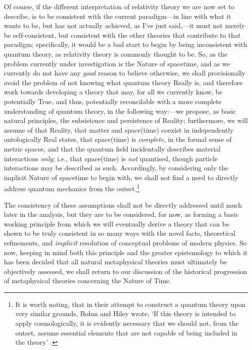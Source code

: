 Of course, if the different interpretation of relativity theory we are now set to describe, is to be consistent with the current paradigm---in line with what it wants to be, but has not actually achieved, as I've just said,---it must not merely be self-consistent, but consistent with the other theories that contribute to that paradigm; specifically, it would be a bad start to begin by being inconsistent with quantum theory, as relativity theory is commonly thought to be. So, as the problem currently under investigation is the Nature of spacetime, and as we currently do not have any \textit{good} reason to believe otherwise, we shall provisionally avoid the problem of not knowing what quantum theory Really is, and therefore work towards developing a theory that may, for all we currently know, be potentially True, and thus, potentially reconcilable with a more complete understanding of quantum theory, in the following way:---we propose, as basic natural principles, the subsistence and persistence of Reality; furthermore, we will assume of that Reality, that matter and space(time) coexist in independently ontologically Real states, that space(time) is \textit{complete}, in the formal sense of metric spaces, and that the quantum field incidentally describes material interactions \textit{only}; i.e., that space(time) is \textit{not} quantised, though particle interactions may be described as such. Accordingly, by considering only the implicit Nature of spacetime to begin with, we shall not find a need to directly address quantum mechanics from the outset.\footnote{It is worth noting, that in their attempt to construct a quantum theory upon very similar grounds, Bohm and Hiley wrote, `If this theory is intended to apply cosmologically, it is evidently necessary that we should not, from the outset, assume essential elements that are not capable of being included in the theory' \cite{Bohm1993}.} 

The consistency of these assumptions shall not be directly addressed until much later in the analysis, but they are to be considered, for now, as forming a basic working principle from which we will eventually derive a theory that can be shown to be truly consistent in so many ways with the novel facts, theoretical refinements, and \textit{implicit} resolution of conceptual problems of modern physics. So now, keeping in mind both this principle and the greater epistemology to which it has been decided that all natural metaphysical theories must ultimately be objectively assessed, we shall return to our discussion of the historical progression of metaphysical theories concerning the Nature of Time.
